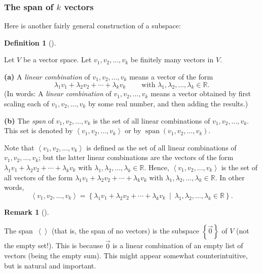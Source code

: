\documentclass[numbers=enddot,12pt,final,onecolumn,notitlepage]{scrartcl}%
\theoremstyle{definition}
\newtheorem{defi}[theo]{Definition}
\newenvironment{definition}[1][]
{\begin{defi}[#1]\begin{leftbar}}
{\end{leftbar}\end{defi}}
\newtheorem{remk}[theo]{Remark}
\newenvironment{remark}[1][]
{\begin{remk}[#1]\begin{leftbar}}
{\end{leftbar}\end{remk}}
\begin{document}
\subsubsection{The span of $k$ vectors}

Here is another fairly general construction of a subspace:

\begin{definition}
\label{def.subspace.span}Let $V$ be a vector space. Let $v_{1},v_{2}%
,\ldots,v_{k}$ be finitely many vectors in $V$.

\textbf{(a)} A \textit{linear combination} of $v_{1},v_{2},\ldots,v_{k}$ means
a vector of the form%
\[
\lambda_{1}v_{1}+\lambda_{2}v_{2}+\cdots+\lambda_{k}v_{k}%
\ \ \ \ \ \ \ \ \ \ \text{with }\lambda_{1},\lambda_{2},\ldots,\lambda_{k}%
\in\mathbb{R}.
\]
(In words: A \textit{linear combination} of $v_{1},v_{2},\ldots,v_{k}$ means a
vector obtained by first scaling each of $v_{1},v_{2},\ldots,v_{k}$ by some
real number, and then adding the results.)

\textbf{(b)} The \textit{span} of $v_{1},v_{2},\ldots,v_{k}$ is the set of all
linear combinations of $v_{1},v_{2},\ldots,v_{k}$. This set is denoted by
$\left\langle v_{1},v_{2},\ldots,v_{k}\right\rangle $ or by
$\operatorname*{span}\left(  v_{1},v_{2},\ldots,v_{k}\right)  $.

Note that $\left\langle v_{1},v_{2},\ldots,v_{k}\right\rangle $ is defined as
the set of all linear combinations of $v_{1},v_{2},\ldots,v_{k}$; but the
latter linear combinations are the vectors of the form $\lambda_{1}%
v_{1}+\lambda_{2}v_{2}+\cdots+\lambda_{k}v_{k}$ with $\lambda_{1},\lambda
_{2},\ldots,\lambda_{k}\in\mathbb{R}$. Hence, $\left\langle v_{1},v_{2}%
,\ldots,v_{k}\right\rangle $ is the set of all vectors of the form
$\lambda_{1}v_{1}+\lambda_{2}v_{2}+\cdots+\lambda_{k}v_{k}$ with $\lambda
_{1},\lambda_{2},\ldots,\lambda_{k}\in\mathbb{R}$. In other words,%
\begin{equation}
\left\langle v_{1},v_{2},\ldots,v_{k}\right\rangle =\left\{  \lambda_{1}%
v_{1}+\lambda_{2}v_{2}+\cdots+\lambda_{k}v_{k}\ \mid\ \lambda_{1},\lambda
_{2},\ldots,\lambda_{k}\in\mathbb{R}\right\}  .
\label{eq.def.subspace.span.explicit}%
\end{equation}

\end{definition}

\begin{remark}
The span\ $\left\langle {}\right\rangle $ (that is, the span of no vectors) is
the subspace $\left\{  \overrightarrow{0}\right\}  $ of $V$ (not the empty
set!). This is because $\overrightarrow{0}$ is a linear combination of an
empty list of vectors (being the empty sum). This might appear somewhat
counterintuitive, but is natural and important.
\end{remark}
\end{document}
